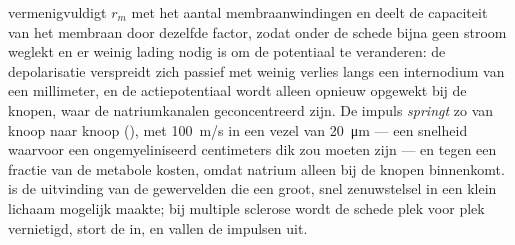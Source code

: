 \begin{proposition}\label{prop:b2:neurons-synapses:myelin}
 vermenigvuldigt $r_m$ met het aantal membraanwindingen en deelt de
capaciteit van het membraan door dezelfde factor, zodat onder de schede
bijna geen stroom weglekt en er weinig lading nodig is om de potentiaal te
veranderen: de depolarisatie verspreidt zich passief met weinig verlies langs
een internodium van een millimeter, en de actiepotentiaal wordt alleen
opnieuw opgewekt bij de knopen, waar de natriumkanalen geconcentreerd zijn.
De impuls \emph{springt} zo van knoop naar knoop (\emph{}), met \qty{100}{m/s} in een vezel van
\qty{20}{\micro m} --- een snelheid waarvoor een ongemyeliniseerd 
centimeters dik zou moeten zijn --- en tegen een fractie van de metabole
kosten, omdat natrium alleen bij de knopen binnenkomt.  is de
uitvinding van de gewervelden die een groot, snel zenuwstelsel in een klein
lichaam mogelijk maakte; bij multiple sclerose wordt de schede plek voor plek
vernietigd, stort de  in, en vallen de impulsen uit.
\end{proposition}

